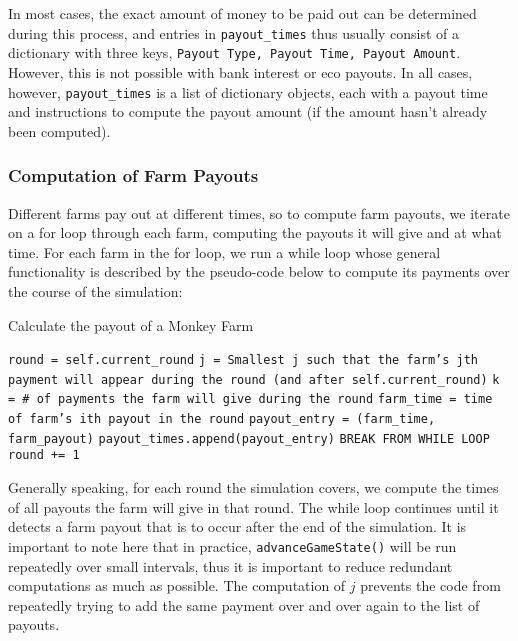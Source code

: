 \documentclass[12pt,letterpaper]{article}
\theoremstyle{remark}
\theoremstyle{plain}
\begin{document}
In most cases, the exact amount of money to be paid out can be determined during this process, and entries in \texttt{payout\_times} thus usually consist of a dictionary with three keys, \texttt{Payout Type, Payout Time, Payout Amount}. However, this is not possible with bank interest or eco payouts. In all cases, however, \texttt{payout\_times} is a list of dictionary objects, each with a payout time and instructions to compute the payout amount (if the amount hasn't already been computed).

\subsubsection{Computation of Farm Payouts}\label{computation of farm payouts}

Different farms pay out at different times, so to compute farm payouts, we iterate on a for loop through each farm, computing the payouts it will give and at what time. For each farm in the for loop, we run a while loop whose general functionality is described by the pseudo-code below to compute its payments over the course of the simulation:

\begin{algorithm}
\caption{Calculate the payout of a Monkey Farm}
\begin{algorithmic}
\State \texttt{round = self.current\_round}
    \State \texttt{j = Smallest j such that the farm's jth payment will appear during the round (and after \texttt{self.current\_round})}
    \State \texttt{k = \# of payments the farm will give during the round}
        \State \texttt{farm\_time = time of farm's ith payout in the round}
            \State \texttt{payout\_entry = (farm\_time, farm\_payout)}
            \State \texttt{payout\_times.append(payout\_entry)}
        \Else
            \State \texttt{BREAK FROM WHILE LOOP}
        \EndIf
    \EndFor
    \State \texttt{round += 1}
\EndWhile
\end{algorithmic}
\end{algorithm}

Generally speaking, for each round the simulation covers, we compute the times of all payouts the farm will give in that round. The while loop continues until it detects a farm payout that is to occur after the end of the simulation. It is important to note here that in practice, \texttt{advanceGameState()} will be run repeatedly over small intervals, thus it is important to reduce redundant computations as much as possible. The computation of $j$ prevents the code from repeatedly trying to add the same payment over and over again to the list of payouts. 
\end{document}

